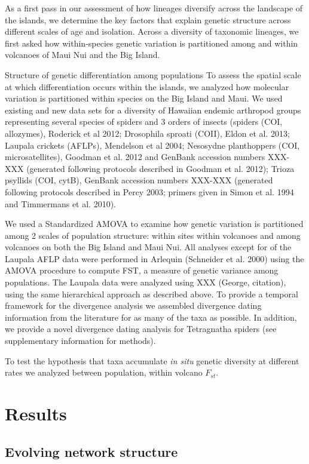 \documentclass[12pt]{article}
\begin{document}
As a first pass in our assessment of how lineages diversify across the
landscape of the islands, we determine the key factors that explain
genetic structure across different scales of age and isolation. Across
a diversity of taxonomic lineages, we first asked how within-species
genetic variation is partitioned among and within volcanoes of Maui
Nui and the Big Island.
 
Structure of genetic differentiation among populations To assess the
spatial scale at which differentiation occurs within the islands, we
analyzed how molecular variation is partitioned within species on the
Big Island and Maui. We used existing and new data sets for a
diversity of Hawaiian endemic arthropod groups representing several
species of spiders and 3 orders of insects (spiders (COI, allozymes),
Roderick et al 2012; Drosophila sproati (COII), Eldon et al. 2013;
Laupala crickets (AFLPs), Mendelson et al 2004; Nesosydne planthoppers
(COI, microsatellites), Goodman et al. 2012 and GenBank accession
numbers XXX-XXX (generated following protocols described in Goodman et
al. 2012); Trioza psyllids (COI, cytB), GenBank accession numbers
XXX-XXX (generated following protocols described in Percy 2003;
primers given in Simon et al. 1994 and Timmermans et al. 2010).

We used a Standardized AMOVA to examine how genetic variation is
partitioned among 2 scales of population structure: within sites
within volcanoes and among volcanoes on both the Big Island and Maui
Nui.  All analyses except for of the Laupala AFLP data were performed
in Arlequin (Schneider et al. 2000) using the AMOVA procedure to
compute FST, a measure of genetic variance among populations. The
Laupala data were analyzed using XXX (George, citation), using the
same hierarchical approach as described above. To provide a temporal
framework for the divergence analysis we assembled divergence dating
information from the literature for as many of the taxa as
possible. In addition, we provide a novel divergence dating analysis
for Tetragnatha spiders (see supplementary information for methods).

To test the hypothesis that taxa accumulate {\it in situ} genetic
diversity at different rates we analyzed between population, within
volcano $F_{st}$.

\section*{Results}

\subsection*{Evolving network structure}
\end{document}
